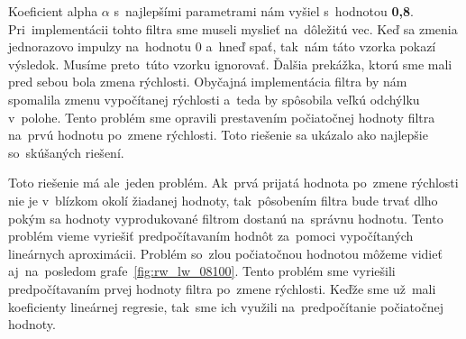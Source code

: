 Koeficient alpha $\alpha$ s~najlepšími parametrami nám vyšiel s~hodnotou \textbf{0,8}. Pri~implementácii tohto filtra
sme museli myslieť na~dôležitú vec. Keď sa zmenia jednorazovo impulzy na~hodnotu 0 a~hneď spať, tak~nám táto vzorka
pokazí výsledok. Musíme preto~túto vzorku ignorovať. Ďalšia prekážka, ktorú sme mali pred sebou bola zmena rýchlosti.
Obyčajná implementácia filtra by nám spomalila zmenu vypočítanej rýchlosti a~teda by spôsobila veľkú odchýlku v~polohe.
Tento problém sme opravili prestavením počiatočnej hodnoty filtra na~prvú hodnotu po~zmene rýchlosti. Toto riešenie sa
ukázalo ako najlepšie so~skúšaných riešení.

Toto riešenie má ale~jeden problém. Ak~prvá prijatá hodnota po~zmene rýchlosti nie je v~blízkom okolí žiadanej
hodnoty, tak~pôsobením filtra bude trvať dlho pokým sa hodnoty vyprodukované filtrom dostanú na~správnu hodnotu.
Tento problém vieme vyriešiť predpočítavaním hodnôt za~pomoci vypočítaných lineárnych aproximácii. Problém so~zlou
počiatočnou hodnotou môžeme vidieť aj~na~posledom grafe~\ref{fig:rw_lw_08100}. Tento problém sme vyriešili
predpočítavaním prvej hodnoty filtra po~zmene rýchlosti. Keďže sme už~mali koeficienty lineárnej regresie, tak~sme
ich využili na~predpočítanie počiatočnej hodnoty.

\clearpage

